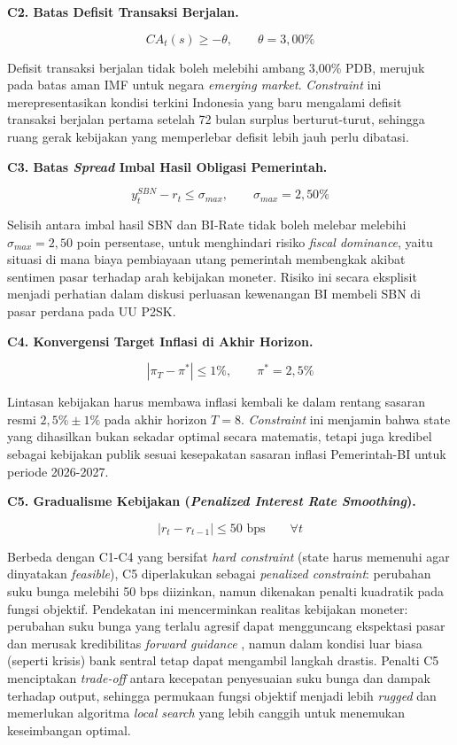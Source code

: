 \textbf{C2. Batas Defisit Transaksi Berjalan.}

\[
    CA_t(s) \geq -\theta, \qquad \theta = 3{,}00\%
\]

Defisit transaksi berjalan tidak boleh melebihi ambang 3,00\% PDB, merujuk pada batas aman IMF untuk negara \textit{emerging market}. \textit{Constraint} ini merepresentasikan kondisi terkini Indonesia yang baru mengalami defisit transaksi berjalan pertama setelah 72 bulan surplus berturut-turut, sehingga ruang gerak kebijakan yang memperlebar defisit lebih jauh perlu dibatasi.

\textbf{C3. Batas \textit{Spread} Imbal Hasil Obligasi Pemerintah.}

\[
    y_t^{SBN} - r_t \leq \sigma_{max}, \qquad \sigma_{max} = 2{,}50\%
\]

Selisih antara imbal hasil SBN dan BI-Rate tidak boleh melebar melebihi $\sigma_{max} = 2{,}50$ poin persentase, untuk menghindari risiko \textit{fiscal dominance}, yaitu situasi di mana biaya pembiayaan utang pemerintah membengkak akibat sentimen pasar terhadap arah kebijakan moneter. Risiko ini secara eksplisit menjadi perhatian dalam diskusi perluasan kewenangan BI membeli SBN di pasar perdana pada UU P2SK.

\textbf{C4. Konvergensi Target Inflasi di Akhir Horizon.}

\[
    \left| \pi_T - \pi^{*} \right| \leq 1\%, \qquad \pi^{*} = 2{,}5\%
\]

Lintasan kebijakan harus membawa inflasi kembali ke dalam rentang sasaran resmi $2{,}5\% \pm 1\%$ pada akhir horizon $T = 8$. \textit{Constraint} ini menjamin bahwa state yang dihasilkan bukan sekadar optimal secara matematis, tetapi juga kredibel sebagai kebijakan publik sesuai kesepakatan sasaran inflasi Pemerintah-BI untuk periode 2026-2027.

\textbf{C5. Gradualisme Kebijakan (\textit{Penalized Interest Rate Smoothing}).}

\[
    \left| r_t - r_{t-1} \right| \leq 50 \text{ bps} \qquad \forall t
\]

Berbeda dengan C1-C4 yang bersifat \textit{hard constraint} (state harus memenuhi agar dinyatakan \textit{feasible}), C5 diperlakukan sebagai \textit{penalized constraint}: perubahan suku bunga melebihi 50 bps diizinkan, namun dikenakan penalti kuadratik pada fungsi objektif. Pendekatan ini mencerminkan realitas kebijakan moneter: perubahan suku bunga yang terlalu agresif dapat mengguncang ekspektasi pasar dan merusak kredibilitas \textit{forward guidance} \cite{woodford2003}, namun dalam kondisi luar biasa (seperti krisis) bank sentral tetap dapat mengambil langkah drastis. Penalti C5 menciptakan \textit{trade-off} antara kecepatan penyesuaian suku bunga dan dampak terhadap output, sehingga permukaan fungsi objektif menjadi lebih \textit{rugged} dan memerlukan algoritma \textit{local search} yang lebih canggih untuk menemukan keseimbangan optimal.

